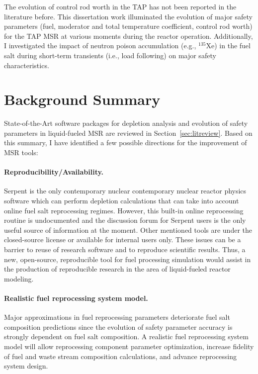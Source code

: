 The evolution of control rod worth in the \gls{TAP} has not been reported in 
the literature before. This dissertation work illuminated the evolution of  
major safety parameters (fuel, moderator and total temperature coefficient, 
control rod worth) for the \gls{TAP} \gls{MSR} at various moments during the 
reactor operation. Additionally, I investigated the impact of neutron poison 
accumulation (e.g., $^{135}$Xe) in the fuel salt during short-term transients 
(i.e., load following) on major safety characteristics.


\section{Background Summary}
State-of-the-Art software packages for depletion analysis and evolution of 
safety parameters in liquid-fueled \gls{MSR} are reviewed in 
Section~\ref{sec:litreview}. Based on this summary, I have identified a few 
possible directions for the improvement of \gls{MSR} tools:
\paragraph{Reproducibility/Availability.}
Serpent is the only contemporary nuclear 
contemporary nuclear 
reactor physics software which can perform depletion calculations that can 
take 
into account online fuel salt reprocessing regimes. However, this built-in 
online reprocessing routine is undocumented  and the discussion forum for 
Serpent users is the only useful source of information at the moment. 
Other mentioned tools are under the closed-source license or available for 
internal users only. These issues can be a barrier to reuse of research 
software and to reproduce scientific results. Thus, a new, open-source, 
reproducible tool for fuel processing simulation would assist in the 
production of reproducible research in the area of liquid-fueled reactor 
modeling.
\paragraph{Realistic fuel reprocessing system model.} 
Major approximations in fuel reprocessing parameters deteriorate fuel salt 
composition predictions since the evolution of safety parameter accuracy is 
strongly dependent on fuel salt composition. A realistic fuel reprocessing 
system model will allow reprocessing component parameter optimization,  
increase fidelity of fuel and waste stream composition calculations, and 
advance reprocessing system design.
